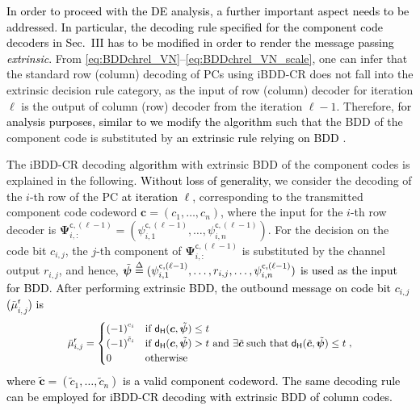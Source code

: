 \documentclass[journal]{IEEEtran}
\newcommand{\nc}{n}
\newcommand{\lc}{\boldsymbol{c}}
\newcommand{\ham}{\mathsf{d}_\mathsf{H}}
\newcommand{\SH}{\textcolor{black}}
\newcommand{\GL}{\textcolor{black}}
\newcommand{\AG}{\textcolor{black}}
\newcommand{\AGc}{\textcolor{black}}
\newcommand\scalemath[2]{\scalebox{#1}{\mbox{\ensuremath{\displaystyle #2}}}}   %
\begin{document}
\medskip

\GL{In order to proceed with the DE analysis, a further important aspect needs to be addressed. In particular, the decoding rule specified for the component code decoders in Sec.~III has to be modified in order to render the message passing \emph{extrinsic}.}
From \eqref{eq:BDDchrel_VN}--\eqref{eq:BDDchrel_VN_scale}, one can infer that the standard row (column) decoding of PCs using iBDD-CR does not fall into the extrinsic decision rule category, as the input of row (column) decoder for iteration $\ell$ is the output of column (row) decoder from the iteration $\ell-1$. Therefore, \AG{for analysis purposes, similar to \cite{JianPfister2017,sheikhTCOM19} we modify the algorithm} such that the BDD of the component code is substituted by \GL{an extrinsic rule relying on BDD} \cite[Sec.~II.B]{JianPfister2017}. 
 
 \GL{T}he iBDD-CR decoding \GL{algorithm} with extrinsic BDD of the component codes is explained in the following. \SH{Without loss of generality}, we consider the decoding of the $i$-th row of the PC \SH{at iteration $\ell$}, corresponding to the transmitted component code codeword $\lc=(c_1,\ldots,c_{\nc})$, where the input for the $i$-th row decoder is $\bm{\Psi}_{i,:}^{\mathsf{c},(\ell-1)}=(\psi_{i,1}^{\mathsf{c},(\ell-1)},\ldots,\psi_{i,n}^{\mathsf{c},(\ell-1)})$. For the decision on the code bit $c_{i,j}$, the $j$-th component of $\bm{\Psi}_{i,:}^{\mathsf{c},(\ell-1)}$ is substituted by the channel output $r_{i,j}$, and hence, \SH{$\tilde{\boldsymbol{\psi}}  \buildrel \Delta \over = 
(\psi_{i,1}^{\mathsf{c},(\ell-1)},\ldots,r_{i,j},\ldots,\psi_{i,n}^{\mathsf{c},(\ell-1)})$ is used as the input for BDD. After performing extrinsic BDD, the outbound message on code bit $c_{i,j}$ ($\bar\mu_{i,j}^{\mathsf r}$)  is}
\SH{
\begin{equation}
\label{eq:BDD_VN_extrinsic}
\scalemath{0.912}{	\bar\mu_{i,j}^{\mathsf r} = \begin{cases}
	{(-1)}^{c_i} & \text{if } \ham(\lc, \tilde{\boldsymbol{\psi}})  \leq t \\
	{(-1)}^{\tilde{c}_i} & \text{if } \ham(\lc, \tilde{\boldsymbol{\psi}}) > t \text{ and
	} \exists{\tilde{\lc}} \; \text{such that} \;\ham(\tilde{\lc}, \tilde{\boldsymbol{\psi}}) \leq t \\
	0 & \text{otherwise}
	\end{cases},}
\end{equation}
where $\tilde{\lc}=(\tilde{c}_1,\ldots,\tilde{c}_{\nc})$ is a valid component codeword. The same decoding rule can be employed for iBDD-CR decoding with extrinsic BDD of column codes.}
\end{document}
